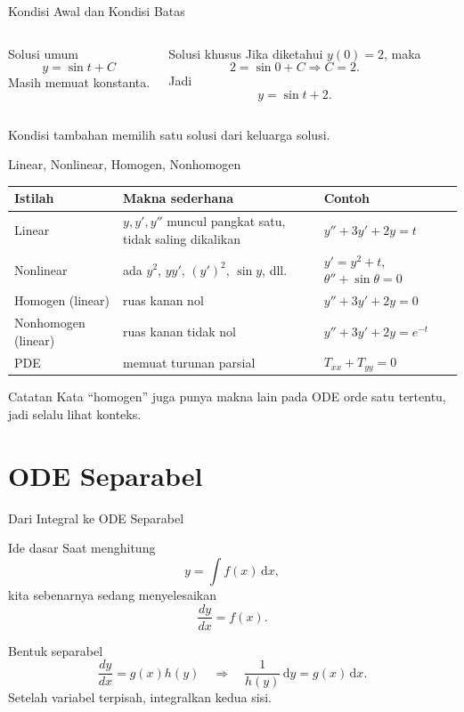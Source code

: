 \documentclass[aspectratio=169,11pt]{beamer}
\newcommand{\dd}{\,\mathrm{d}}
\begin{document}
\begin{frame}{Kondisi Awal dan Kondisi Batas}
\begin{columns}
\begin{block}{Solusi umum}
\[
 y=\sin t+C
\]
Masih memuat konstanta.
\end{block}
\begin{block}{Solusi khusus}
Jika diketahui $y(0)=2$, maka
\[
 2=\sin 0+C \Rightarrow C=2.
\]
Jadi
\[
 y=\sin t+2.
\]
\end{block}
\end{columns}
\vspace{0.2cm}
Kondisi tambahan memilih satu solusi dari keluarga solusi.
\end{frame}

\begin{frame}{Linear, Nonlinear, Homogen, Nonhomogen}
\scriptsize
\begin{tabular}{p{3.1cm}p{4.1cm}p{4.7cm}}
\toprule
\textbf{Istilah} & \textbf{Makna sederhana} & \textbf{Contoh} \\
\midrule
Linear & $y,y',y''$ muncul pangkat satu, tidak saling dikalikan & $y''+3y'+2y=t$ \\
Nonlinear & ada $y^2$, $yy'$, $(y')^2$, $\sin y$, dll. & $y'=y^2+t$, $\theta''+\sin\theta=0$ \\
Homogen (linear) & ruas kanan nol & $y''+3y'+2y=0$ \\
Nonhomogen (linear) & ruas kanan tidak nol & $y''+3y'+2y=e^{-t}$ \\
PDE & memuat turunan parsial & $T_{xx}+T_{yy}=0$ \\
\bottomrule
\end{tabular}
\vspace{0.25cm}
\begin{alertblock}{Catatan}
Kata ``homogen'' juga punya makna lain pada ODE orde satu tertentu, jadi selalu lihat konteks.
\end{alertblock}
\end{frame}

\section{ODE Separabel}

\begin{frame}{Dari Integral ke ODE Separabel}
\begin{block}{Ide dasar}
Saat menghitung
\[
 y=\int f(x)\dd x,
\]
kita sebenarnya sedang menyelesaikan
\[
 \frac{dy}{dx}=f(x).
\]
\end{block}
\begin{block}{Bentuk separabel}
\[
\frac{dy}{dx}=g(x)h(y)
\quad \Rightarrow \quad
\frac{1}{h(y)}\dd y=g(x)\dd x.
\]
Setelah variabel terpisah, integralkan kedua sisi.
\end{block}
\end{frame}
\end{document}
